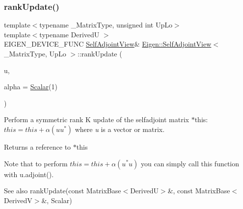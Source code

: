 \subsubsection{\texorpdfstring{rankUpdate()}{rankUpdate()}\hspace{0.1cm}{\footnotesize\ttfamily [2/2]}}
{\footnotesize\ttfamily template$<$typename \+\_\+\+Matrix\+Type, unsigned int Up\+Lo$>$ \\
template$<$typename DerivedU $>$ \\
E\+I\+G\+E\+N\+\_\+\+D\+E\+V\+I\+C\+E\+\_\+\+F\+U\+NC \mbox{\hyperlink{class_eigen_1_1_self_adjoint_view}{Self\+Adjoint\+View}}\& \mbox{\hyperlink{class_eigen_1_1_self_adjoint_view}{Eigen\+::\+Self\+Adjoint\+View}}$<$ \+\_\+\+Matrix\+Type, Up\+Lo $>$\+::rank\+Update (\begin{DoxyParamCaption}\item[{const \mbox{\hyperlink{class_eigen_1_1_matrix_base}{Matrix\+Base}}$<$ DerivedU $>$ \&}]{u,  }\item[{const \mbox{\hyperlink{class_eigen_1_1_self_adjoint_view_af52acc0942ece2de9b6db4a99cc6656e}{Scalar}} \&}]{alpha = {\ttfamily \mbox{\hyperlink{class_eigen_1_1_self_adjoint_view_af52acc0942ece2de9b6db4a99cc6656e}{Scalar}}(1)} }\end{DoxyParamCaption})}

Perform a symmetric rank K update of the selfadjoint matrix {\ttfamily $\ast$this}\+: $ this = this + \alpha ( u u^* ) $ where {\itshape u} is a vector or matrix.

\begin{DoxyReturn}{Returns}
a reference to {\ttfamily $\ast$this} 
\end{DoxyReturn}
Note that to perform $ this = this + \alpha ( u^* u ) $ you can simply call this function with u.\+adjoint().

\begin{DoxySeeAlso}{See also}
rank\+Update(const Matrix\+Base$<$\+Derived\+U$>$\&, const Matrix\+Base$<$\+Derived\+V$>$\&, Scalar) 
\end{DoxySeeAlso}
\mbox{\label{class_eigen_1_1_self_adjoint_view_abdff2b280dd18dfbe1ca99338b381870}} 

